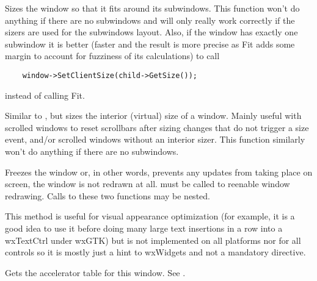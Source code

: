 


\label{wxwindowfit}


Sizes the window so that it fits around its subwindows. This function won't do
anything if there are no subwindows and will only really work correctly if the
sizers are used for the subwindows layout. Also, if the window has exactly one
subwindow it is better (faster and the result is more precise as Fit adds some
margin to account for fuzziness of its calculations) to call

\begin{verbatim}
    window->SetClientSize(child->GetSize());
\end{verbatim}

instead of calling Fit.


\label{wxwindowfitinside}


Similar to , but sizes the interior (virtual) size
of a window.  Mainly useful with scrolled windows to reset scrollbars after
sizing changes that do not trigger a size event, and/or scrolled windows without
an interior sizer.  This function similarly won't do anything if there are no
subwindows.


\label{wxwindowfreeze}


Freezes the window or, in other words, prevents any updates from taking place
on screen, the window is not redrawn at all.  must
be called to reenable window redrawing. Calls to these two functions may be
nested.

This method is useful for visual appearance optimization (for example, it
is a good idea to use it before doing many large text insertions in a row into
a wxTextCtrl under wxGTK) but is not implemented on all platforms nor for all
controls so it is mostly just a hint to wxWidgets and not a mandatory
directive.


\label{wxwindowgetacceleratortable}


Gets the accelerator table for this window. See .


